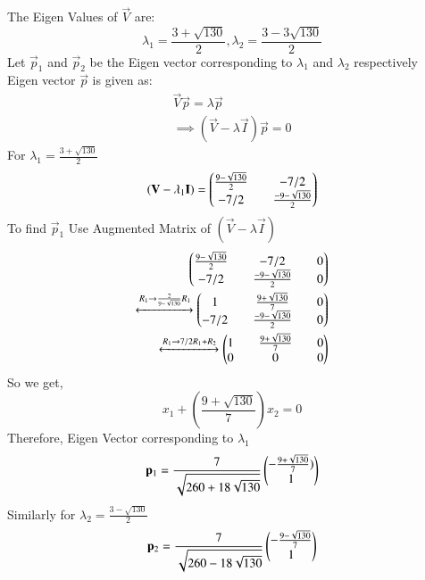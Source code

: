 The Eigen Values of $\vec{V}$ are:
\begin{equation} \label{eq:solutions/2/6/24/2.26}
\lambda_1 = \frac{3+\sqrt{130}}{2}, \lambda_2 = \frac{3-3\sqrt{130}}{2}
\end{equation}
Let $\vec{p}_1$ and $\vec{p}_2$ be the Eigen vector corresponding to $\lambda_1$ and $\lambda_2$ respectively\\
Eigen vector $\vec{p}$ is given as:
\begin{equation} \label{eq:solutions/2/6/24/2.27}
\begin{split}
\vec{V}\vec{p} = \lambda\vec{p}\\
\implies (\vec{V} - \lambda \vec{I})\vec{p} = 0
\end{split}
\end{equation}
For $\lambda_1 = \frac{3+\sqrt{130}}{2}$
\begin{equation}\label{eq:solutions/2/6/24/2.28}
(\mathbf{V} - \lambda_1 \mathbf{I}) = \begin{pmatrix}\frac{9-\sqrt{130}}{2} && -7/2\\ -7/2 && \frac{-9-\sqrt{130}}{2}\end{pmatrix}
\end{equation}
To find $ \vec{p}_1 $ Use Augmented Matrix of $(\vec{V} - \lambda \vec{I})$
\begin{equation} \label{eq:solutions/2/6/24/2.29}
\begin{split}
 \begin{pmatrix}\frac{9-\sqrt{130}}{2} && -7/2 && 0\\ -7/2 && \frac{-9-\sqrt{130}}{2} && 0\end{pmatrix}\\
\xleftrightarrow[]{R_1\rightarrow \frac{2}{9-\sqrt{130}}R_1} 
\begin{pmatrix}1 && \frac{9+\sqrt{130}}{7} && 0\\ -7/2 && \frac{-9-\sqrt{130}}{2} && 0\end{pmatrix}\\
\xleftrightarrow[]{R_1\rightarrow 7/2R_1+R_2} 
\begin{pmatrix}1 && \frac{9+\sqrt{130}}{7} && 0\\ 0 && 0 && 0\end{pmatrix} 
\end{split}
\end{equation}
So we get,
\begin{equation} \label{eq:solutions/2/6/24/2.30}
x_1 + (\frac{9+\sqrt{130}}{7})x_2 = 0
\end{equation}
Therefore, Eigen Vector corresponding to $\lambda_1$
\begin{equation} \label{eq:solutions/2/6/24/2.31}
\mathbf{p}_1 =\frac{7}{\sqrt{260+18\sqrt{130}}} \begin{pmatrix}-\frac{9+\sqrt{130}}{7}) \\ 1\end{pmatrix}
\end{equation}
Similarly for $\lambda_2 = \frac{3-\sqrt{130}}{2}$
\begin{equation}\label{eq:solutions/2/6/24/2.32}
\mathbf{p}_2 =\frac{7}{\sqrt{260-18\sqrt{130}}} \begin{pmatrix}-\frac{9-\sqrt{130}}{7} \\ 1\end{pmatrix}
\end{equation}
